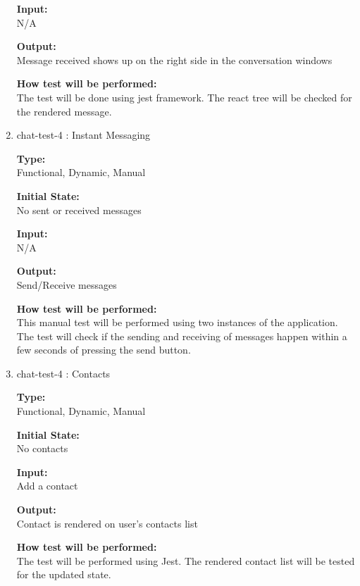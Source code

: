 \documentclass[12pt, titlepage]{article}
\begin{document}
\begin{enumerate}
\textbf{Input:}\\ N/A
					
\textbf{Output:}\\ Message received shows up on the right side in the conversation windows
					
\textbf{How test will be performed:}\\ 
The test will be done using jest framework. The react tree will be checked for the rendered message.

\item{chat-test-4 : Instant Messaging\\}

\textbf{Type:}\\ Functional, Dynamic, Manual
					
\textbf{Initial State:}\\ No sent or received messages
					
\textbf{Input:}\\ N/A
					
\textbf{Output:}\\ Send/Receive messages
					
\textbf{How test will be performed:}\\ 
This manual test will be performed using two instances of the application. The test will check if the sending and receiving of messages happen within a few seconds of pressing the send button.

\item{chat-test-4 : Contacts\\}

\textbf{Type:}\\ Functional, Dynamic, Manual
					
\textbf{Initial State:}\\ No contacts
					
\textbf{Input:}\\ Add a contact
					
\textbf{Output:}\\ Contact is rendered on user's contacts list
					
\textbf{How test will be performed:}\\ 
The test will  be performed using Jest. The rendered contact list will be tested for the updated state.
\end{enumerate}
\end{document}

